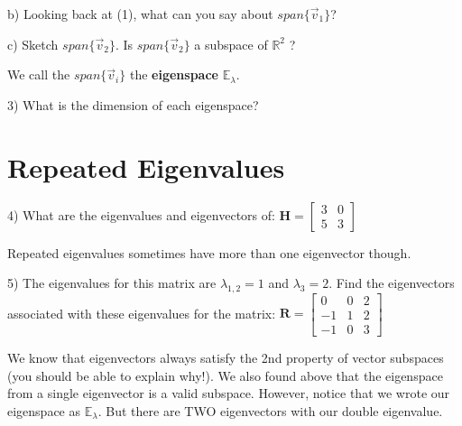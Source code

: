 \documentclass{article}
\begin{document}
\begin{flushleft}
\begin{flushleft}
\vspace{2in}

b) Looking back at (1), what can you say about $span\{ \vec{v}_1 \}$? 

\vspace{1in}

c) Sketch $span\{ \vec{v}_2 \}$. Is $span\{ \vec{v}_2 \}$ a subspace of $\mathbb{R}^2$ ?   

\vspace{2in}

We call the $span\{ \vec{v}_i \}$ the \textbf{eigenspace} $\mathbb{E}_{\lambda}$. \\

\vspace{0.2in}

3) What is the dimension of each eigenspace?

\newpage

\section*{Repeated Eigenvalues}

4) What are the eigenvalues and eigenvectors of: 
$\textbf{H}=
\begin{bmatrix}
3 & 0 \\
5 & 3
\end{bmatrix}$

\vspace{3in}

Repeated eigenvalues sometimes have more than one eigenvector though.

\vspace{0.1in}

5) The eigenvalues for this matrix are $\lambda_{1,2}=1$ and $\lambda_3 = 2$. Find the eigenvectors associated with these eigenvalues for the matrix: 
$\textbf{R}=
\begin{bmatrix}
0 & 0 & 2 \\
-1 & 1 & 2 \\
-1 & 0 & 3
\end{bmatrix} $\\


\newpage

We know that eigenvectors always satisfy the 2nd property of vector subspaces (you should be able to explain why!). We also found above that the eigenspace from a single eigenvector is a valid subspace. However, notice that we wrote our eigenspace as $\mathbb{E}_{\lambda}$. But there are TWO eigenvectors with our double eigenvalue. 


\end{flushleft}
\end{flushleft}
\end{document}
